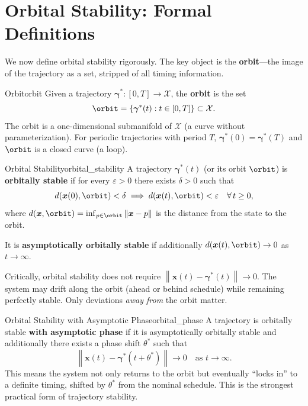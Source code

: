 \documentclass[12pt, openany]{book}
\theoremstyle{plain}
\newcommand{\state}{\bm{x}}
\newcommand{\traj}{\bm{\gamma}}
\newcommand{\statespace}{\mathcal{X}}
\newcommand{\norm}[1]{\left\lVert #1 \right\rVert}
\begin{document}
\section{Orbital Stability: Formal Definitions}

We now define orbital stability rigorously. The key object is the
\textbf{orbit}---the image of the trajectory as a set, stripped of all
timing information.

\begin{definition}{Orbit}{orbit}
  Given a trajectory $\traj^*: [0, T] \to \statespace$, the \textbf{orbit}
  is the set
  \begin{equation}
    \orbit = \{\traj^*(t) : t \in [0, T]\} \subset \statespace.
  \end{equation}
  The orbit is a one-dimensional submanifold of $\statespace$ (a curve
  without parameterization). For periodic trajectories with period $T$,
  $\traj^*(0) = \traj^*(T)$ and $\orbit$ is a closed curve (a loop).
\end{definition}

\begin{definition}{Orbital Stability}{orbital_stability}
  A trajectory $\traj^*(t)$ (or its orbit $\orbit$) is \textbf{orbitally
  stable} if for every $\varepsilon > 0$ there exists $\delta > 0$ such that
  \begin{equation}\label{eq:orbital_stability}
    d(\state(0), \orbit) < \delta \implies
    d(\state(t), \orbit) < \varepsilon \quad \forall\, t \geq 0,
  \end{equation}
  where $d(\state, \orbit) = \inf_{p \in \orbit} \norm{\state - p}$ is the
  distance from the state to the orbit.

  It is \textbf{asymptotically orbitally stable} if additionally
  $d(\state(t), \orbit) \to 0$ as $t \to \infty$.
\end{definition}

Critically, orbital stability does not require $\norm{\state(t) - \traj^*(t)}
\to 0$. The system may drift along the orbit (ahead or behind schedule) while
remaining perfectly stable. Only deviations \emph{away from} the orbit matter.

\begin{definition}{Orbital Stability with Asymptotic Phase}{orbital_phase}
  A trajectory is orbitally stable \textbf{with asymptotic phase} if it is
  asymptotically orbitally stable and additionally there exists a phase shift
  $\theta^*$ such that
  \begin{equation}
    \norm{\state(t) - \traj^*(t + \theta^*)} \to 0 \quad \text{as } t \to \infty.
  \end{equation}
  This means the system not only returns to the orbit but eventually
  ``locks in'' to a definite timing, shifted by $\theta^*$ from the
  nominal schedule. This is the strongest practical form of trajectory
  stability.
\end{definition}
\end{document}
